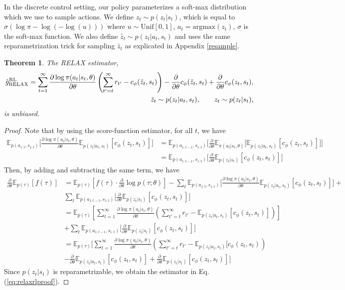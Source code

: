 \documentclass{article}
\newcommand{\E}{\mathbb{E}}
\newcommand{\LL}[1]{\frac{\partial \log \pi(a_{#1}| s_{#1}, \theta)}{\partial \theta}}
\newcommand{\PT}{\frac{\partial}{\partial \theta}}
\newcommand{\LP}[1]{\PT \log p(#1)}
\newcommand{\RL}{{\textnormal{RL}}}
\newcommand{\RELAX}{{\textnormal{RELAX}}}
\newtheorem{theorem}{Theorem}[section]
\begin{document}
In the discrete control setting, our policy parameterizes a soft-max distribution which we use to sample actions. We define $z_t\sim p(z_t|s_t)$, which is equal to $\sigma (\log\pi - \log(-\log(u)))$ where $u\sim \text{Unif}[0, 1]$, $a_t = \text{argmax}(z_t)$, $\sigma$ is the soft-max function. We also define $\tilde{z_t} \sim p(z_t|a_t,s_t)$ and uses the same reparametrization trick for sampling $\tilde{z_t}$ as explicated in Appendix \ref{resample}.
\begin{theorem}
The \RELAX{} estimator,
\begin{align}
\hat g_\RELAX^{\RL} = \sum_{t=1}^{\infty} \LL{t}\left(\sum_{t'=t}^{\infty} r_{t'} - c_\phi(\tilde{z}_t, s_t)\right)-\frac{\partial}{\partial\theta}c_\phi(\tilde{z}_t, s_t)+\frac{\partial}{\partial\theta}c_\phi(z_t, s_t), \label{eq:relaxrlproof}\\
\tilde{z}_t \sim p(z_t|a_t,s_t), \qquad z_t \sim p(z_t|s_t)\nonumber, 
\end{align}
is unbiased.
\end{theorem}
\begin{proof}
Note that by using the score-function estimator, for all $t$, we have 
%
\begin{align*}
\E_{p(a_{1:t},s_{1:t})}\Big[\LL{t} \E_{p(z_t|a_t,s_t)}[c_\phi(z_t, s_t)]\Big] &= \E_{p(a_{1:t-1},s_{1:t})}\Big[\frac{\partial}{\partial\theta}\E_{\pi(a_t|s_t, \theta)}\Big[\E_{p(z_t|a_t,s_t)}[c_\phi(z_t, s_t)]\Big]\Big]\\
&=\E_{p(a_{1:t-1},s_{1:t})}\Big[\frac{\partial}{\partial\theta}\E_{p(z_t|s_t)}[c_\phi(z_t, s_t)]\Big]
\end{align*}
Then, by adding and subtracting the same term, we have
\begin{align*}
\PT\E_{p(\tau)}[f(\tau)] &= \E_{p(\tau)}\left[f(\tau)\cdot\LP{\tau;\theta}\right]-\sum_t\E_{p(a_{1:t},s_{1:t})}\Big[\LL{t} \E_{p(z_t|a_t,s_t)}[c_\phi(z_t, s_t)]\Big]+\\
&\sum_t\E_{p(a_{1:t-1},s_{1:t})}\Big[\frac{\partial}{\partial\theta}\E_{p(z_t|s_t)}[c_\phi(z_t, s_t)]\Big]\nonumber\\
&= \E_{p(\tau)}\left[ \sum_{t=1}^{\infty} \LL{t}\left(\sum_{t'=t}^{\infty} r_{t'} - \E_{p(z_t|a_t,s_t)}[c_\phi(z_t, s_t)]\right)\right]\\&+\sum_t\E_{p(a_{1:t-1},s_{1:t})}\Big[\frac{\partial}{\partial\theta}\E_{p(z_t|s_t)}[c_\phi(z_t, s_t)]\Big]\nonumber\\
&= \E_{p(\tau)}\Big[ \sum_{t=1}^{\infty} \LL{t}\left(\sum_{t'=t}^{\infty} r_{t'} - \E_{p(z_t|a_t,s_t)}[c_\phi(z_t, s_t)\right)\\
&-\frac{\partial}{\partial\theta}\E_{p(z_t|a_t,s_t)}[c_\phi(z_t, s_t)]+\frac{\partial}{\partial\theta}\E_{p(z_t|s_t)}[c_\phi(z_t, s_t)]\Big]\nonumber
\end{align*}
Since $p(z_t|s_t)$ is reparametrizable, we obtain the estimator in Eq.(\ref{eq:relaxrlproof}).
\end{proof}
\end{document}
